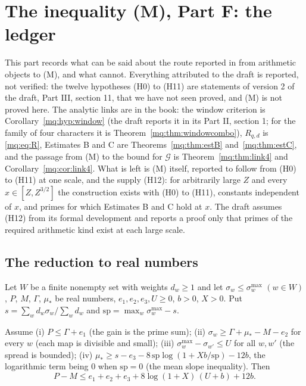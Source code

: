\section{The inequality (M), Part F: the ledger}\label{mqc:sec:partf}

This part records what can be said about the route reported in \cite{Rub26} from arithmetic objects to (M), and what cannot. Everything attributed to the draft is reported, not verified: the twelve hypotheses (H0) to (H11) are statements of version 2 of the draft, Part III, section 11, that we have not seen proved, and (M) is not proved here. The analytic links are in the book: the window criterion is Corollary~\ref{mq:hyp:window} (the draft reports it in its Part II, section 1; for the family of four characters it is Theorem~\ref{mq:thm:windowcombo}), $R_{q,d}$ is \eqref{mq:eq:R}, Estimates B and C are Theorems~\ref{mq:thm:estB} and~\ref{mq:thm:estC}, and the passage from (M) to the bound for $\mathcal G$ is Theorem~\ref{mq:thm:link4} and Corollary~\ref{mq:cor:link4}. What is left is (M) itself, reported to follow from (H0) to (H11) at one scale, and the supply (H12): for arbitrarily large $Z$ and every $x\in[Z,Z^{3/2}]$ the construction exists with (H0) to (H11), constants independent of $x$, and primes for which Estimates B and C hold at $x$. The draft assumes (H12) from its formal development and reports a proof only that primes of the required arithmetic kind exist at each large scale.

\subsection*{The reduction to real numbers}

Let $W$ be a finite nonempty set with weights $d_w\ge1$ and let $\sigma_w\le\sigma_w^{\max}$ $(w\in W)$, $P$, $M$, $\Gamma$, $\mu_*$ be real numbers, $e_1,e_2,e_3,U\ge0$, $b>0$, $X>0$. Put $s=\sum_wd_w\sigma_w/\sum_wd_w$ and $\mathrm{sp}=\max_w\sigma_w^{\max}-s$.

\begin{theorem}\label{mqc:thm:ledger}
Assume (i) $P\le\Gamma+e_1$ (the gain is the prime sum); (ii) $\sigma_w\ge\Gamma+\mu_*-M-e_2$ for every $w$ (each map is divisible and small); (iii) $\sigma_w^{\max}-\sigma_{w'}\le U$ for all $w,w'$ (the spread is bounded); (iv) $\mu_*\ge s-e_3-8\,\mathrm{sp}\log(1+Xb/\mathrm{sp})-12b$, the logarithmic term being $0$ when $\mathrm{sp}=0$ (the mean slope inequality). Then
\[
P-M\le e_1+e_2+e_3+8\log(1+X)\,(U+b)+12b .
\]
\end{theorem}

